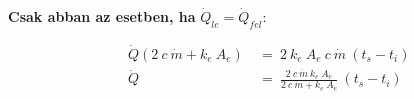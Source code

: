 \textbf{Csak abban az esetben, ha} $\dot Q_{le}=\dot Q_{fel}$:




\begin{equation} \label{holeadas4}
\begin{aligned}
~~~~~~\dot Q (2 ~ c ~ \dot{m} + k_e ~ A_e) & ~=~ 2 ~ k_e ~ A_e ~ c~ \dot{m} ~(t_s-t_i) \\[18pt]
~~~~~~\dot Q &~=~ \frac{2~c~\dot{m}~k_e~A_e}{2 ~c ~ \dot{m} + k_e ~ A_e}~(t_s-t_i)
\end{aligned}
\end{equation}